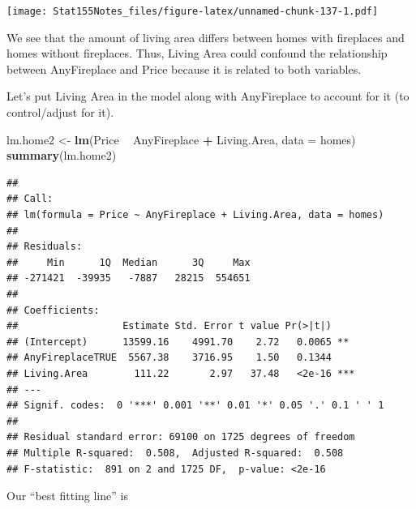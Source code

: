 \documentclass[]{book}
\newenvironment{Shaded}{\begin{snugshade}}{\end{snugshade}}
\newcommand{\DataTypeTok}[1]{\textcolor[rgb]{0.13,0.29,0.53}{#1}}
\newcommand{\KeywordTok}[1]{\textcolor[rgb]{0.13,0.29,0.53}{\textbf{#1}}}
\newcommand{\NormalTok}[1]{#1}
\newcommand{\OperatorTok}[1]{\textcolor[rgb]{0.81,0.36,0.00}{\textbf{#1}}}
\newcommand{\StringTok}[1]{\textcolor[rgb]{0.31,0.60,0.02}{#1}}
\begin{document}
\begin{Shaded}
\end{Shaded}

\texttt{[image: Stat155Notes\_files/figure-latex/unnamed-chunk-137-1.pdf]}

We see that the amount of living area differs between homes with fireplaces and homes without fireplaces. Thus, Living Area could confound the relationship between AnyFireplace and Price because it is related to both variables.

Let's put Living Area in the model along with AnyFireplace to account for it (to control/adjust for it).

\begin{Shaded}
\begin{Highlighting}[]
\NormalTok{lm.home2 <-}\StringTok{ }\KeywordTok{lm}\NormalTok{(Price }\OperatorTok{~}\StringTok{ }\NormalTok{AnyFireplace }\OperatorTok{+}\StringTok{ }\NormalTok{Living.Area, }\DataTypeTok{data =}\NormalTok{ homes)}
\KeywordTok{summary}\NormalTok{(lm.home2)}
\end{Highlighting}
\end{Shaded}

\begin{verbatim}
## 
## Call:
## lm(formula = Price ~ AnyFireplace + Living.Area, data = homes)
## 
## Residuals:
##     Min      1Q  Median      3Q     Max 
## -271421  -39935   -7887   28215  554651 
## 
## Coefficients:
##                  Estimate Std. Error t value Pr(>|t|)    
## (Intercept)      13599.16    4991.70    2.72   0.0065 ** 
## AnyFireplaceTRUE  5567.38    3716.95    1.50   0.1344    
## Living.Area        111.22       2.97   37.48   <2e-16 ***
## ---
## Signif. codes:  0 '***' 0.001 '**' 0.01 '*' 0.05 '.' 0.1 ' ' 1
## 
## Residual standard error: 69100 on 1725 degrees of freedom
## Multiple R-squared:  0.508,  Adjusted R-squared:  0.508 
## F-statistic:  891 on 2 and 1725 DF,  p-value: <2e-16
\end{verbatim}

Our ``best fitting line'' is
\end{document}
